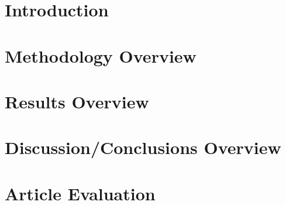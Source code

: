 \documentclass[
10pt, %
letterpaper, %
twocolumn, %
landscape %
]{article}
\begin{document}
\pagestyle{myheadings} %
\markright{\doctitle} %


\thispagestyle{plain} %

\printtitle %


\section{Introduction}




\section{Methodology Overview}




\section{Results Overview}




\section{Discussion/Conclusions Overview}




\section*{Article Evaluation}




\renewcommand{\refname}{Reference} %


\end{document}
